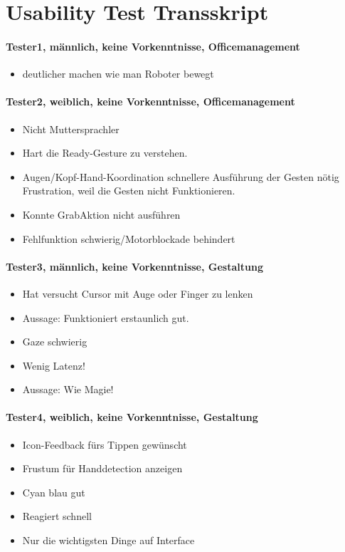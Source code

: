 \section{Usability Test Transskript}\label{transscrikpt}
\paragraph*{Tester1, männlich, keine Vorkenntnisse, Officemanagement}
\begin{itemize}
	\item deutlicher machen wie man Roboter bewegt
\end{itemize}
\paragraph*{Tester2, weiblich, keine Vorkenntnisse, Officemanagement}
\begin{itemize}
	\item Nicht Muttersprachler
	\item Hart die Ready-Gesture zu verstehen.
	\item Augen/Kopf-Hand-Koordination schnellere Ausführung der Gesten nötig Frustration, weil die Gesten nicht Funktionieren.
	\item Konnte \frqq Grab\flqq\-Aktion nicht ausführen
\item Fehlfunktion schwierig/Motorblockade behindert
\end{itemize}
\paragraph*{Tester3, männlich, keine Vorkenntnisse, Gestaltung}
\begin{itemize}
	\item Hat versucht Cursor mit Auge oder Finger zu lenken
	\item Aussage: \frqq Funktioniert erstaunlich gut.\flqq
	\item Gaze schwierig
	\item Wenig Latenz!
	\item Aussage: \frqq Wie Magie!\flqq
\end{itemize}
\paragraph*{Tester4, weiblich, keine Vorkenntnisse, Gestaltung}
\begin{itemize}
	\item Icon-Feedback fürs Tippen gewünscht
	\item Frustum für Handdetection anzeigen
	\item Cyan blau gut
	\item Reagiert schnell
	\item Nur die wichtigsten Dinge auf Interface
\end{itemize}
